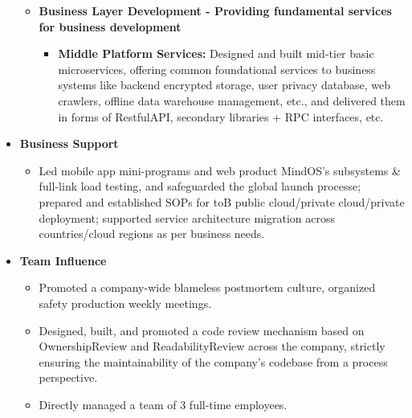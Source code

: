 \documentclass[letterpaper,11pt]{article}
\begin{document}
\begin{spacing}{1.0}
\begin{itemize}
\begin{itemize}
			\item \textbf{Business Layer Development - Providing fundamental services for business development}
			\begin{itemize}
				\item \textbf{Middle Platform Services: }Designed and built mid-tier basic microservices, offering common foundational services to business systems like backend encrypted storage, user privacy database, web crawlers, offline data warehouse management, etc., and delivered them in forms of RestfulAPI, secondary libraries + RPC interfaces, etc.
			\end{itemize}
		\end{itemize}
		\item \textbf{Business Support}
		\begin{itemize}
			\item Led mobile app mini-programs and web product MindOS's subsystems \& full-link load testing, and safeguarded the global launch processe; prepared and established SOPs for toB public cloud/private cloud/private deployment; supported service architecture migration across countries/cloud regions as per business needs.
		\end{itemize}
		\item \textbf{Team Influence}
		\begin{itemize}
			\item Promoted a company-wide blameless postmortem culture, organized safety production weekly meetings.
			\item Designed, built, and promoted a code review mechanism based on OwnershipReview and ReadabilityReview across the company, strictly ensuring the maintainability of the company's codebase from a process perspective.
			\item Directly managed a team of 3 full-time employees.
		\end{itemize}
	\end{itemize}
	

\end{spacing}
\end{document}
